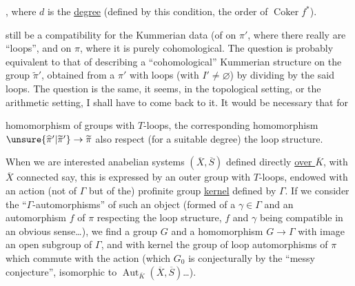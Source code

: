

,
where $d$ is the \uline{degree} (defined  
by this condition,
   the order of $\operatorname{Coker}f^{*}$). 

 
still be a compatibility
for the Kummerian data (of
 on $\pi'$, where there really are
``loops'', and on $\pi$, where it is
purely cohomological. \unsure{\S} The question
is probably equivalent to that of describing
a ``cohomological'' Kummerian structure
on the group $\widetilde\pi'$, obtained from a $\pi'$ with
loops (with $I'\ne\varnothing$) by dividing by
the said loops. The question is the
same, it seems, in the topological setting,
or the arithmetic setting, I shall have to
come back to it. It would be necessary that for 



homomorphism  of groups with $T$-loops, the corresponding homomorphism
$\unsure{\widehat\pi'|\widetilde\pi'}\to\widetilde\pi$ also respect (for
a suitable degree) the loop structure.

When we are interested  anabelian systems
$(\overline X,\overline S)$ defined directly \uline{over $\overline K$}, with $\overline X$
connected say, this is expressed
by an outer group with $T$-loops,
endowed with an action (not of $\Gamma$ but
of the) profinite group \uline{kernel} defined by $\Gamma$.
If we consider the  ``$\Gamma$-automorphisms'' of
such an object (formed of a $\gamma\in\Gamma$ and
an  automorphism $f$ of $\pi$ respecting the
loop structure, $f$ and $\gamma$ being compatible
in an obvious sense\dots), we find
a group  $G$ and a homomorphism  $G\to\Gamma$
with image an open subgroup of $\Gamma$, and
with kernel  the group of  loop automorphisms of $\pi$ which commute with the action 
  (which $G_0$ is conjecturally by the
``messy conjecture'', isomorphic to  $\operatorname{Aut}_{\overline K}(\overline X,\overline S)$\dots).


